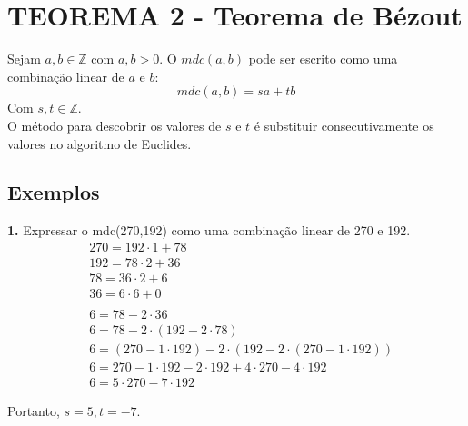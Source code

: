 \section*{TEOREMA 2 - Teorema de Bézout}
Sejam $a, b \in \mathbb{Z}$ com $a,b > 0$. O $mdc(a,b)$ pode ser escrito como uma combinação linear de $a$ e $b$:
\[
    mdc(a,b) = sa + tb
\]
Com $s,t \in \mathbb{Z}$.\\
O método para descobrir os valores de $s$ e $t$ é substituir consecutivamente os valores no algoritmo de Euclides.

\subsection*{Exemplos}
\textbf{1.} Expressar o mdc(270,192) como uma combinação linear de 270 e 192.
\begin{align*}
     & 270 = 192 \cdot 1 + 78                                                \\
     & 192 = 78 \cdot 2 + 36                                                 \\
     & 78 = 36 \cdot 2 + 6                                                   \\
     & 36 = 6 \cdot 6 + 0                                                    \\
    \\
     & 6 = 78 - 2 \cdot 36                                                   \\
     & 6 = 78 - 2 \cdot (192 - 2 \cdot 78)                                   \\
     & 6 = (270 - 1 \cdot 192) - 2 \cdot (192 - 2 \cdot (270 - 1 \cdot 192)) \\
     & 6 = 270 -  1 \cdot 192 - 2 \cdot 192 + 4 \cdot 270 - 4 \cdot 192      \\
     & 6 = 5 \cdot 270 - 7 \cdot 192
\end{align*}
\par Portanto, $s = 5, t = -7$.